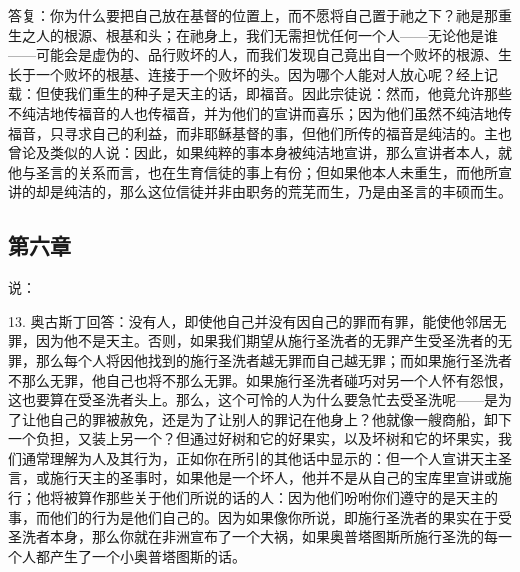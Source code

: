 答复：你为什么要把自己放在基督的位置上，而不愿将自己置于祂之下？祂是那重生之人的根源、根基和头；在祂身上，我们无需担忧任何一个人——无论他是谁——可能会是虚伪的、品行败坏的人，而我们发现自己竟出自一个败坏的根源、生长于一个败坏的根基、连接于一个败坏的头。因为哪个人能对人放心呢？经上记载：但使我们重生的种子是天主的话，即福音。因此宗徒说：然而，他竟允许那些不纯洁地传福音的人也传福音，并为他们的宣讲而喜乐；因为他们虽然不纯洁地传福音，只寻求自己的利益，而非耶稣基督的事，但他们所传的福音是纯洁的。主也曾论及类似的人说：因此，如果纯粹的事本身被纯洁地宣讲，那么宣讲者本人，就他与圣言的关系而言，也在生育信徒的事上有份；但如果他本人未重生，而他所宣讲的却是纯洁的，那么这位信徒并非由职务的荒芜而生，乃是由圣言的丰硕而生。\par


\subsection{第六章}

说：\par

13. 奥古斯丁回答：没有人，即使他自己并没有因自己的罪而有罪，能使他邻居无罪，因为他不是天主。否则，如果我们期望从施行圣洗者的无罪产生受圣洗者的无罪，那么每个人将因他找到的施行圣洗者越无罪而自己越无罪；而如果施行圣洗者不那么无罪，他自己也将不那么无罪。如果施行圣洗者碰巧对另一个人怀有怨恨，这也要算在受圣洗者头上。那么，这个可怜的人为什么要急忙去受圣洗呢——是为了让他自己的罪被赦免，还是为了让别人的罪记在他身上？他就像一艘商船，卸下一个负担，又装上另一个？但通过好树和它的好果实，以及坏树和它的坏果实，我们通常理解为人及其行为，正如你在所引的其他话中显示的：但一个人宣讲天主圣言，或施行天主的圣事时，如果他是一个坏人，他并不是从自己的宝库里宣讲或施行；他将被算作那些关于他们所说的话的人：因为他们吩咐你们遵守的是天主的事，而他们的行为是他们自己的。因为如果像你所说，即施行圣洗者的果实在于受圣洗者本身，那么你就在非洲宣布了一个大祸，如果奥普塔图斯所施行圣洗的每一个人都产生了一个小奥普塔图斯的话。\par

